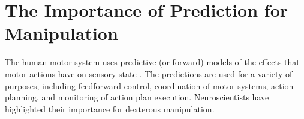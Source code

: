 \section{The Importance of Prediction for Manipulation}
\label{sec:motivation}
The human motor system uses predictive (or forward) models of the effects that motor actions have on sensory state \citep{flanagan03,flanagan06,mehta02,witney00,johansson92}. The predictions are used for a variety of purposes, including feedforward control, coordination of motor systems, action planning, and monitoring of action plan execution. Neuroscientists have highlighted their importance for dexterous manipulation.



